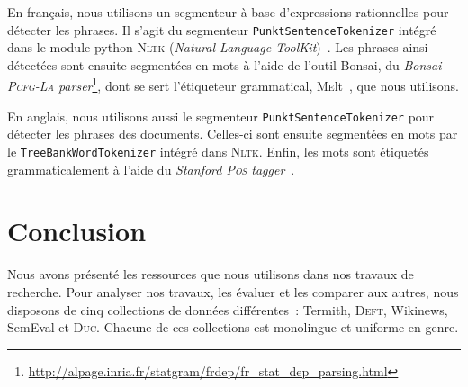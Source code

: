     En français, nous utilisons un segmenteur à base d'expressions rationnelles
    pour détecter les phrases. Il s'agit du segmenteur
    \texttt{PunktSentenceTokenizer} intégré dans le module python \textsc{Nltk}
    (\textit{Natural Language ToolKit})~\cite{bird2009nltk}. Les phrases ainsi
    détectées sont ensuite segmentées en mots à l'aide de l'outil Bonsai, du
    \textit{Bonsai \textsc{Pcfg-La}
    parser}\footnote{\url{http://alpage.inria.fr/statgram/frdep/fr_stat_dep_parsing.html}},
    dont se sert l'étiqueteur grammatical, \textsc{Me}lt~\cite{denis2009melt},
    que nous utilisons.

    En anglais, nous utilisons aussi le segmenteur
    \texttt{PunktSentenceTokenizer} pour détecter les phrases des documents.
    Celles-ci sont ensuite segmentées en mots par le
    \texttt{Tree\-BankWordTokenizer} intégré dans \textsc{Nltk}. Enfin, les mots
    sont étiquetés grammaticalement à l'aide du \textit{Stanford \textsc{Pos}
    tagger}~\cite{toutanova2003stanfordpostagger}.


  \section{Conclusion}
  \label{sec:main-data_description-conclusion}
    Nous avons présenté les ressources que nous utilisons dans nos
    travaux de recherche. Pour analyser nos travaux, les évaluer et les comparer
    aux autres, nous disposons de cinq collections de données différentes~:
    Termith, \textsc{Deft}, Wikinews, SemEval et \textsc{Duc}. Chacune de ces
    collections est monolingue et uniforme en genre.

